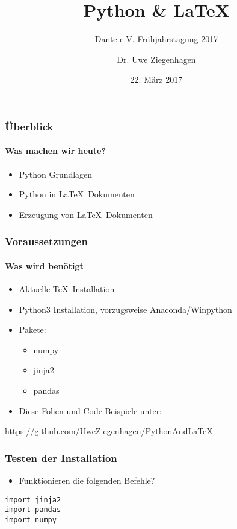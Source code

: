 \documentclass[12pt,ngerman]{beamer}
\author{Dr. Uwe Ziegenhagen}
\title{Python \& \LaTeX}
\subtitle{Dante e.V. Frühjahrstagung 2017}
\date{22. März 2017}
\begin{document}
\begin{frame}

\maketitle

\end{frame}


\begin{frame}
\frametitle{Überblick}
\framesubtitle{Was machen wir heute?}

\begin{itemize}
\item Python Grundlagen
\item Python in \LaTeX\ Dokumenten
\item Erzeugung von \LaTeX\ Dokumenten
\end{itemize}
\end{frame}


\begin{frame}
\frametitle{Voraussetzungen}
\framesubtitle{Was wird benötigt}

\begin{itemize}
\item Aktuelle \TeX\ Installation
\item Python3 Installation, vorzugsweise Anaconda/Winpython
\item Pakete:
\begin{itemize}
	\item numpy
	\item jinja2
	\item pandas
\end{itemize}
\item Diese Folien und Code-Beispiele unter: 
\end{itemize}

\url{https://github.com/UweZiegenhagen/PythonAndLaTeX}

\end{frame}

\begin{frame}[containsverbatim]
\frametitle{Testen der Installation}

\begin{itemize}
	\item Funktionieren die folgenden Befehle?
\end{itemize}

\begin{lstlisting}
import jinja2
import pandas
import numpy
\end{lstlisting}
\end{frame}
\end{document}
